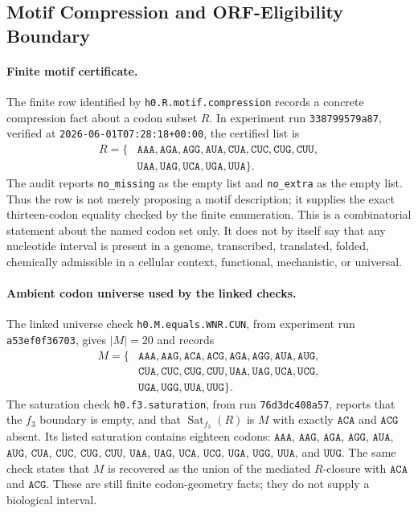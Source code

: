 
\subsection{Motif Compression and ORF-Eligibility Boundary}
\label{sec:bioreality-h0-r-motif-compression}

\paragraph{Finite motif certificate.}
The finite row identified by \texttt{h0.R.motif.compression} records a concrete compression fact about a codon subset $R$.  In experiment run \texttt{338799579a87}, verified at \texttt{2026-06-01T07:28:18+00:00}, the certified list is
$$
\begin{aligned}
R=\{&\texttt{AAA},\texttt{AGA},\texttt{AGG},\texttt{AUA},\texttt{CUA},\texttt{CUC},\texttt{CUG},\texttt{CUU},\\
&\texttt{UAA},\texttt{UAG},\texttt{UCA},\texttt{UGA},\texttt{UUA}\}.
\end{aligned}
$$
The audit reports \texttt{no\_missing} as the empty list and \texttt{no\_extra} as the empty list.  Thus the row is not merely proposing a motif description; it supplies the exact thirteen-codon equality checked by the finite enumeration.  This is a combinatorial statement about the named codon set only.  It does not by itself say that any nucleotide interval is present in a genome, transcribed, translated, folded, chemically admissible in a cellular context, functional, mechanistic, or universal.

\paragraph{Ambient codon universe used by the linked checks.}
The linked universe check \texttt{h0.M.equals.WNR.CUN}, from experiment run \texttt{a53ef0f36703}, gives $|M|=20$ and records
$$
\begin{aligned}
M=\{&\texttt{AAA},\texttt{AAG},\texttt{ACA},\texttt{ACG},\texttt{AGA},\texttt{AGG},\texttt{AUA},\texttt{AUG},\\
&\texttt{CUA},\texttt{CUC},\texttt{CUG},\texttt{CUU},\texttt{UAA},\texttt{UAG},\texttt{UCA},\texttt{UCG},\\
&\texttt{UGA},\texttt{UGG},\texttt{UUA},\texttt{UUG}\}.
\end{aligned}
$$
The saturation check \texttt{h0.f3.saturation}, from run \texttt{76d3dc408a57}, reports that the $f_3$ boundary is empty, and that $\operatorname{Sat}_{f_3}(R)$ is $M$ with exactly $\texttt{ACA}$ and $\texttt{ACG}$ absent.  Its listed saturation contains eighteen codons: $\texttt{AAA}$, $\texttt{AAG}$, $\texttt{AGA}$, $\texttt{AGG}$, $\texttt{AUA}$, $\texttt{AUG}$, $\texttt{CUA}$, $\texttt{CUC}$, $\texttt{CUG}$, $\texttt{CUU}$, $\texttt{UAA}$, $\texttt{UAG}$, $\texttt{UCA}$, $\texttt{UCG}$, $\texttt{UGA}$, $\texttt{UGG}$, $\texttt{UUA}$, and $\texttt{UUG}$.  The same check states that $M$ is recovered as the union of the mediated $R$-closure with $\texttt{ACA}$ and $\texttt{ACG}$.  These are still finite codon-geometry facts; they do not supply a biological interval.

